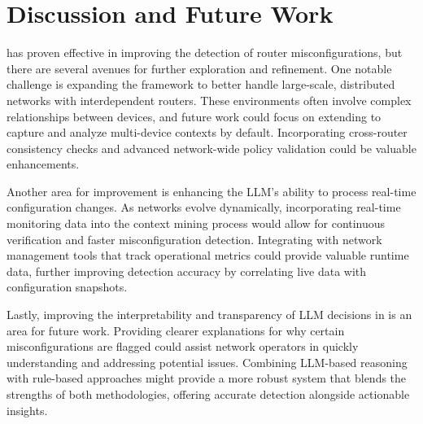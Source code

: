 \section{Discussion and Future Work}
\label{sec:future}

\sysname{} has proven effective in improving the detection of router misconfigurations, but there are several avenues for further exploration and refinement. One notable challenge is expanding the framework to better handle large-scale, distributed networks with interdependent routers. These environments often involve complex relationships between devices, and future work could focus on extending \sysname{} to capture and analyze multi-device contexts by default. Incorporating cross-router consistency checks and advanced network-wide policy validation could be valuable enhancements.

Another area for improvement is enhancing the LLM's ability to process real-time configuration changes. As networks evolve dynamically, incorporating real-time monitoring data into the context mining process would allow for continuous verification and faster misconfiguration detection. Integrating \sysname{} with network management tools that track operational metrics could provide valuable runtime data, further improving detection accuracy by correlating live data with configuration snapshots.

Lastly, improving the interpretability and transparency of LLM decisions in \sysname{} is an area for future work. Providing clearer explanations for why certain misconfigurations are flagged could assist network operators in quickly understanding and addressing potential issues. Combining LLM-based reasoning with rule-based approaches might provide a more robust system that blends the strengths of both methodologies, offering accurate detection alongside actionable insights.